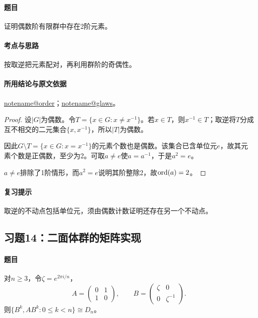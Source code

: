 \documentclass[UTF8,a4paper,11pt,fontset=windows]{ctexart}
\makeatletter
\newcommand{\noteref}[1]{\hyperref[note:#1]{\csname notename@#1\endcsname}}
\newcommand{\exref}[2]{\hyperref[ex:#1:#2]{第#1章习题#2}}
\makeatother
\begin{document}
\paragraph{题目}
证明偶数阶有限群中存在2阶元素。

\paragraph{考点与思路}
按取逆把元素配对，再利用群阶的奇偶性。

\paragraph{所用结论与原文依据}
\noteref{order}；\noteref{glaws}。


\begin{proof}
设$|G|$为偶数。令$T=\{x\in G:x\ne x^{-1}\}$。若$x\in T$，则$x^{-1}\in T$；取逆将$T$分成互不相交的二元集合$\{x,x^{-1}\}$，所以$|T|$为偶数。

因此$G\setminus T=\{x\in G:x=x^{-1}\}$的元素个数也是偶数。该集合已含单位元$e$，故其元素个数是正偶数，至少为2。可取$a\ne e$使$a=a^{-1}$，于是$a^2=e$。

$a\ne e$排除了1阶情形，而$a^2=e$说明其阶整除2，故$\operatorname{ord}(a)=2$。
\end{proof}

\paragraph{复习提示}
取逆的不动点包括单位元，须由偶数计数证明还存在另一个不动点。


\subsection{习题14：\texorpdfstring{二面体群的矩阵实现}{二面体群的矩阵实现}}
\label{ex:1:14}

\paragraph{题目}
对$n\geq3$，令$\zeta=e^{2\pi i/n}$，
\[
A=\begin{pmatrix}0&1\\1&0\end{pmatrix},\qquad B=\begin{pmatrix}\zeta&0\\0&\zeta^{-1}\end{pmatrix}.
\]
则$\{B^k,AB^k:0\leq k<n\}\cong D_n$。
\end{document}

